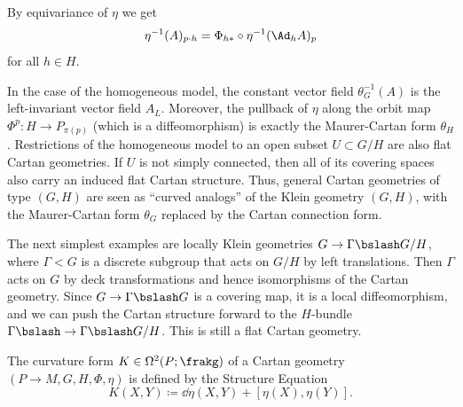 By equivariance of $\eta$ we get 
\[\eta^{-1}(A)_{p\cdot h}=\Phi_{h\ast}\circ \eta^{-1}(\Ad_h A)_p\]
for all $h\in H$. 


\begin{example}
    In the case of the homogeneous model, the constant vector field $\theta_G^{-1}(A)$ is the left-invariant vector field $A_L$. Moreover, the pullback of $\eta$ along the orbit map $\Phi^p:H\to P_{\pi(p)}$ (which is a diffeomorphism) is exactly the Maurer-Cartan form $\theta_H$. Restrictions of the homogeneous model to an open subset $U\subset G\slash H$ are also flat Cartan geometries. If $U$ is not simply connected, then all of its covering spaces also carry an induced flat Cartan structure.
     Thus, general Cartan geometries of type $(G,H)$ are seen as ``curved analogs'' of the Klein geometry $(G,H)$, with the Maurer-Cartan form $\theta_G$ replaced by the Cartan connection form.
\end{example}

\begin{example}
    The next simplest examples are locally Klein geometries $G\to \Gamma\bslash G\slash H$, where $\Gamma<G$ is a discrete subgroup that acts on $G\slash H$ by left translations. Then $\Gamma$ acts on $G$ by deck transformations and hence isomorphisms of the Cartan geometry. Since $G\to \Gamma\bslash G$ is a covering map, it is a local diffeomorphism, and we can push the Cartan structure forward to the $H$-bundle $\Gamma\bslash \to \Gamma\bslash G\slash H$. This is still a flat Cartan geometry.
\end{example}


\begin{defn}
    The curvature form $K\in\Omega^2(P;\frakg)$ of a Cartan geometry $(P\to M,G,H,\Phi,\eta)$ is defined by the Structure Equation 
    \[K(X,Y)\coloneqq \dd\eta(X,Y)+[\eta(X),\eta(Y)].\]
\end{defn}


